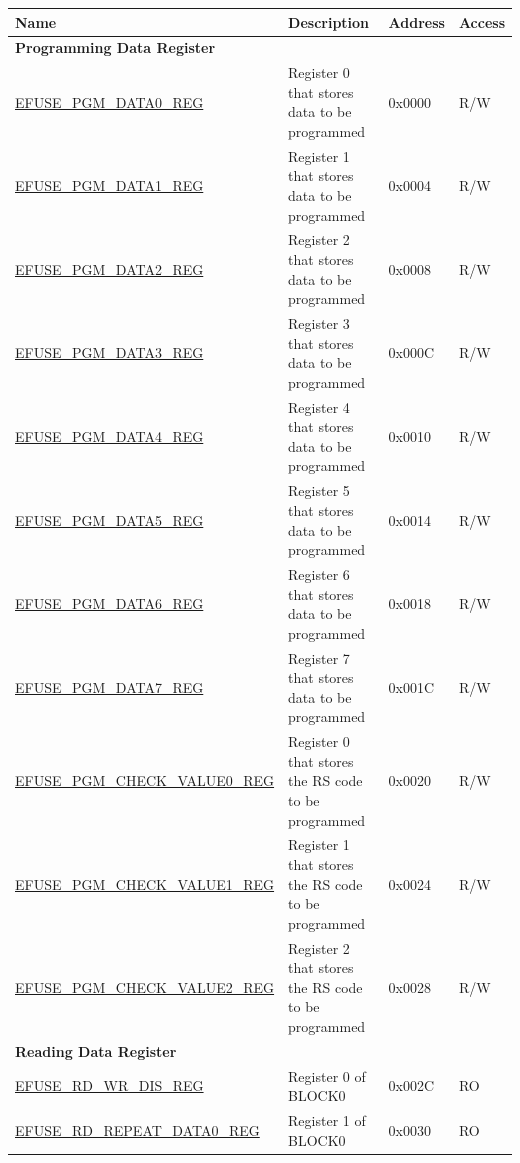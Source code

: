 \begin{longtable}{ | p{6.8cm} | p{7cm} | p{1.3cm} | p{1.2cm} | }
\hline\rowcolor{lightgray}
Name & Description &  Address & Access \\ \hline
\endhead
\multicolumn{4}{|l|}{\textbf{Programming Data Register}} \\ \hline
\hyperref[regdesc:EFUSEPGMDATA0REG]{EFUSE\_PGM\_DATA0\_REG} & Register 0 that stores data to be programmed & 0x0000 & R/W \\ \hline
\hyperref[regdesc:EFUSEPGMDATA1REG]{EFUSE\_PGM\_DATA1\_REG} & Register 1 that stores data to be programmed & 0x0004 & R/W \\ \hline
\hyperref[regdesc:EFUSEPGMDATA2REG]{EFUSE\_PGM\_DATA2\_REG} & Register 2 that stores data to be programmed & 0x0008 & R/W \\ \hline
\hyperref[regdesc:EFUSEPGMDATA3REG]{EFUSE\_PGM\_DATA3\_REG} & Register 3 that stores data to be programmed & 0x000C & R/W \\ \hline
\hyperref[regdesc:EFUSEPGMDATA4REG]{EFUSE\_PGM\_DATA4\_REG} & Register 4 that stores data to be programmed & 0x0010 & R/W \\ \hline
\hyperref[regdesc:EFUSEPGMDATA5REG]{EFUSE\_PGM\_DATA5\_REG} & Register 5 that stores data to be programmed & 0x0014 & R/W \\ \hline
\hyperref[regdesc:EFUSEPGMDATA6REG]{EFUSE\_PGM\_DATA6\_REG} & Register 6 that stores data to be programmed & 0x0018 & R/W \\ \hline
\hyperref[regdesc:EFUSEPGMDATA7REG]{EFUSE\_PGM\_DATA7\_REG} & Register 7 that stores data to be programmed & 0x001C & R/W \\ \hline
\hyperref[regdesc:EFUSEPGMCHECKVALUE0REG]{EFUSE\_PGM\_CHECK\_VALUE0\_REG} & Register 0 that stores the RS code to be programmed & 0x0020 & R/W \\ \hline
\hyperref[regdesc:EFUSEPGMCHECKVALUE1REG]{EFUSE\_PGM\_CHECK\_VALUE1\_REG} & Register 1 that stores the RS code to be programmed & 0x0024 & R/W \\ \hline
\hyperref[regdesc:EFUSEPGMCHECKVALUE2REG]{EFUSE\_PGM\_CHECK\_VALUE2\_REG} & Register 2 that stores the RS code to be programmed & 0x0028 & R/W \\ \hline
\multicolumn{4}{|l|}{\textbf{Reading Data Register}} \\ \hline
\hyperref[regdesc:EFUSERDWRDISREG]{EFUSE\_RD\_WR\_DIS\_REG} & Register 0 of BLOCK0 & 0x002C & RO \\ \hline
\hyperref[regdesc:EFUSERDREPEATDATA0REG]{EFUSE\_RD\_REPEAT\_DATA0\_REG} & Register 1 of BLOCK0 & 0x0030 & RO \\ \hline

\end{longtable}
